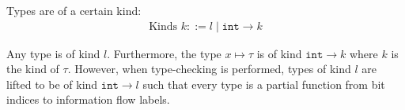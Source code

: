 Types are of a certain kind:
\begin{align*}
    \text{Kinds } k ::= l \mid \texttt{int} \rightarrow k
\end{align*}

Any type is of kind $ l $.
Furthermore, the type $ x \mapsto \tau $ is of kind $ \texttt{int} \rightarrow k $ where $ k $ is the kind of $ \tau $.
However, when type-checking is performed, types of kind $ l $ are lifted to be of kind $ \texttt{int} \rightarrow l $ such that every type is a partial function from bit indices to information flow labels.



